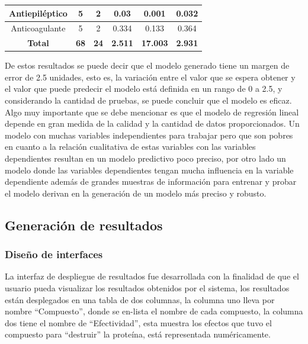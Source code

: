 {\begin{longtable}{|c|c|c|c|c|c|}
Antiepiléptico                           & 5                      & 2                        & 0.03                           & 0.001                          & 0.032                            \\ 
\hline
Anticoagulante                           & 5                      & 2                        & 0.334                          & 0.133                          & 0.364                            \\ 
\hline
\textbf{Total}                           & \textbf{68}            & \textbf{24}              & \textbf{2.511}                 & \textbf{17.003}                & \textbf{2.931}                   \\
\hline
\end{longtable}

\noindent De estos resultados se puede decir que el modelo generado tiene un margen de error de 2.5 unidades, esto es, la variación entre el valor que se espera obtener y el valor que puede predecir el modelo está definida en un rango de 0 a 2.5, y considerando la cantidad de pruebas, se puede concluir que el modelo es eficaz.\\

\noindent Algo muy importante que se debe mencionar es que el modelo de regresión lineal depende en gran medida de la calidad y la cantidad de datos proporcionados. Un modelo con muchas variables independientes para trabajar pero que son pobres en cuanto a la relación cualitativa de estas variables con las variables dependientes resultan en un modelo predictivo poco preciso, por otro lado un modelo donde las variables dependientes tengan mucha influencia en la variable dependiente además de grandes muestras de información para entrenar y probar el modelo derivan en la generación de un modelo más preciso y robusto.
}

\subsection{Generación de resultados}
\subsubsection{Diseño de interfaces}
\noindent La interfaz de despliegue de resultados fue desarrollada con la finalidad de que el usuario pueda visualizar los resultados obtenidos por el sistema, los resultados están desplegados en una tabla de dos columnas, la columna uno lleva por nombre “Compuesto”, donde se en-lista el nombre de cada compuesto, la columna dos tiene el nombre de “Efectividad”, esta muestra los efectos que tuvo el compuesto para “destruir” la proteína, está  representada numéricamente. 


